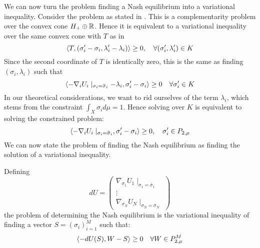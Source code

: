 We can now turn the problem finding a Nash equilibrium into a variational inequality. Consider the problem as stated in . This is a complementarity problem over the convex cone $H_+ \oplus \mathbb{R}$. Hence it is equivalent to a variational inequality over the same convex cone with $T$ as in 
\begin{equation}
  \left \langle T,(\sigma_i' -\sigma_i,\lambda_i'-\lambda_i) \right \rangle \geq 0, \quad \forall (\sigma_i', \lambda_i') \in K
\end{equation}
Since the second coordinate of $T$ is identically zero, this is the same as finding $(\sigma_i,\lambda_i)$ such that
\begin{equation}
  \label{eq:simp_var_eq}
  \ip{-\nabla_i U_i \mid_{\sigma_i = \overbar{\sigma}_i} - \lambda_i}{\sigma_i' -\sigma_i} \geq 0 \quad \forall \sigma_i' \in K
\end{equation}
In our theoretical considerations, we want to rid ourselves of the term $\lambda_i$, which stems from the constraint $\int_X \sigma_i d\mu = 1$. Hence solving  over $K$ is equivalent to solving the constrained problem:
\begin{equation}
  \ip{-\nabla_i U_i \mid_{\sigma_i = \overbar{\sigma}_i}}{\sigma_i' -\sigma_i} \geq 0, \quad \sigma_i' \in P_{2,\mu}
\end{equation}
We can now state the problem of finding the Nash equilibrium  as finding the solution of a variational inequality.
\begin{definition}
  \label{def:var_eq_nash}
  Defining
\begin{equation}
  dU = \begin{pmatrix} \nabla_{\sigma_1} U_1 \mid_{\sigma_1 = \overbar{\sigma}_1}\\
      \vdots \\
      \nabla_{\sigma_N} U_N \mid_{\sigma_N = \overbar{\sigma}_N} \end{pmatrix}
\end{equation}
the problem of determining the Nash equilibrium  is the variational inequality of finding a vector $S = (\sigma_i)_{i=1}^M$ such that:
\begin{equation}
  \left \langle -dU(S),W-S \right \rangle \geq 0 \quad \forall W\in P_{2,\mu}^M
\end{equation}
\end{definition}


